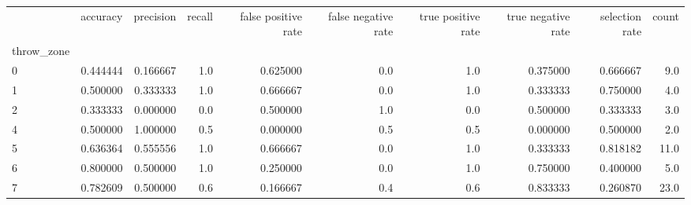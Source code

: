 \begin{tabular}{lrrrrrrrrr}
\toprule
{} &  accuracy &  precision &  recall &  false positive rate &  false negative rate &  true positive rate &  true negative rate &  selection rate &  count \\
throw\_zone &           &            &         &                      &                      &                     &                     &                 &        \\
\midrule
0          &  0.444444 &   0.166667 &     1.0 &             0.625000 &                  0.0 &                 1.0 &            0.375000 &        0.666667 &    9.0 \\
1          &  0.500000 &   0.333333 &     1.0 &             0.666667 &                  0.0 &                 1.0 &            0.333333 &        0.750000 &    4.0 \\
2          &  0.333333 &   0.000000 &     0.0 &             0.500000 &                  1.0 &                 0.0 &            0.500000 &        0.333333 &    3.0 \\
4          &  0.500000 &   1.000000 &     0.5 &             0.000000 &                  0.5 &                 0.5 &            0.000000 &        0.500000 &    2.0 \\
5          &  0.636364 &   0.555556 &     1.0 &             0.666667 &                  0.0 &                 1.0 &            0.333333 &        0.818182 &   11.0 \\
6          &  0.800000 &   0.500000 &     1.0 &             0.250000 &                  0.0 &                 1.0 &            0.750000 &        0.400000 &    5.0 \\
7          &  0.782609 &   0.500000 &     0.6 &             0.166667 &                  0.4 &                 0.6 &            0.833333 &        0.260870 &   23.0 \\
\bottomrule
\end{tabular}

